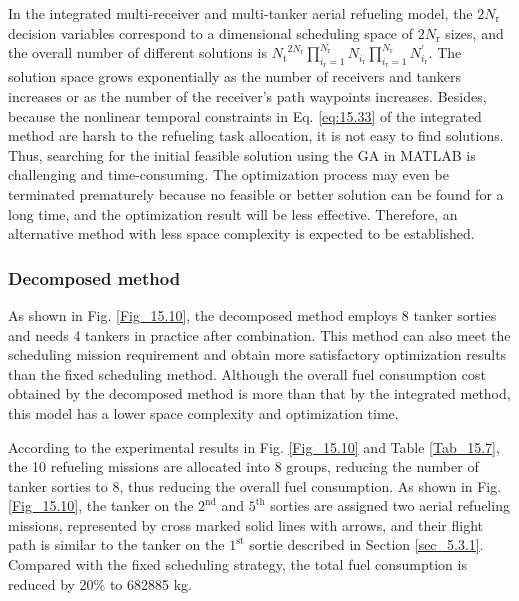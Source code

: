 In the integrated multi-receiver and multi-tanker aerial refueling model, the    $2N_{\text{r}}$ decision variables correspond to a dimensional scheduling space of $2N_{\text{r}}$ sizes, and the overall number of different solutions is ${N_\text{t}}^{2N_\text{r}}\prod_{i_\text{r}=1}^{N_\text{r}}N_{i_\text{r}}\prod_{i_\text{r}=1}^{N_\text{r}}N_{i_\text{r}}^{\prime}$. The solution space grows exponentially as the number of receivers and tankers increases or as the number of the receiver's path waypoints increases. Besides, because the nonlinear temporal constraints in Eq. \ref{eq:15.33} of the integrated method are harsh to the refueling task allocation, it is not easy to find solutions. Thus, searching for the initial feasible solution using the GA in MATLAB is challenging and time-consuming. The optimization process may even be terminated prematurely because no feasible or better solution can be found for a long time, and the optimization result will be less effective. Therefore, an alternative method with less space complexity is expected to be established.

\subsubsection{Decomposed method}

As shown in Fig. \ref{Fig_15.10}, the decomposed method employs 8 tanker sorties and needs 4 tankers in practice after combination. This method can also meet the scheduling mission requirement and obtain more satisfactory optimization results than the fixed scheduling method. Although the overall fuel consumption cost obtained by the decomposed method is more than that by the integrated method, this model has a lower space complexity and optimization time.

According to the experimental results in Fig. \ref{Fig_15.10} and Table \ref{Tab_15.7}, the 10 refueling missions are allocated into 8 groups, reducing the number of tanker sorties to 8, thus reducing the overall fuel consumption. As shown in Fig. \ref{Fig_15.10}, the tanker on the $2^\text{nd}$ and $5^\text{th}$ sorties are assigned two aerial refueling missions, represented by cross marked solid lines with arrows, and their flight path is similar to the tanker on the $1^\text{st}$ sortie described in Section \ref{sec_5.3.1}. Compared with the fixed scheduling strategy, the total fuel consumption is reduced by 20\% to 682885 kg.


